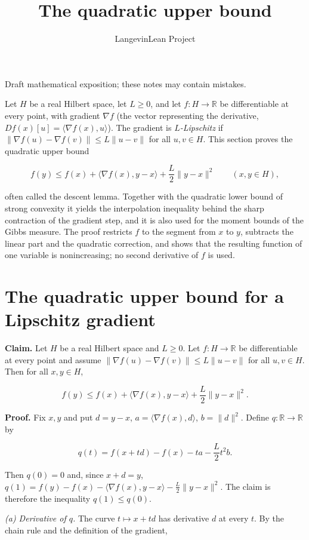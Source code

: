 \documentclass[11pt,a4paper]{article}
\title{\texorpdfstring{The quadratic upper bound}{The quadratic upper bound}}
\author{LangevinLean Project}
\date{}
\begin{document}
\maketitle
Draft mathematical exposition; these notes may contain mistakes.


Let \(H\) be a real Hilbert space, let \(L\ge0\), and let \(f:H\to\mathbb R\) be differentiable at every point, with gradient \(\nabla f\) (the vector representing the derivative, \(Df(x)[u]=\langle\nabla f(x),u\rangle\)). The gradient is \emph{\(L\)-Lipschitz} if \(\|\nabla f(u)-\nabla f(v)\|\le L\|u-v\|\) for all \(u,v\in H\). This section proves the quadratic upper bound


\[f(y)\le f(x)+\langle\nabla f(x),y-x\rangle+\frac L2\|y-x\|^2\qquad(x,y\in H),\]


often called the descent lemma. Together with the quadratic lower bound of strong convexity it yields the interpolation inequality behind the sharp contraction of the gradient step, and it is also used for the moment bounds of the Gibbs measure. The proof restricts \(f\) to the segment from \(x\) to \(y\), subtracts the linear part and the quadratic correction, and shows that the resulting function of one variable is nonincreasing; no second derivative of \(f\) is used.


\section{\texorpdfstring{The quadratic upper bound for a Lipschitz gradient}{The quadratic upper bound for a Lipschitz gradient}}


\textbf{Claim.} Let \(H\) be a real Hilbert space and \(L\ge0\). Let \(f:H\to\mathbb R\) be differentiable at every point and assume \(\|\nabla f(u)-\nabla f(v)\|\le L\|u-v\|\) for all \(u,v\in H\). Then for all \(x,y\in H\),


\[f(y)\le f(x)+\langle\nabla f(x),y-x\rangle+\frac L2\|y-x\|^2.\]


\textbf{Proof.} Fix \(x,y\) and put \(d=y-x\), \(a=\langle\nabla f(x),d\rangle\), \(b=\|d\|^2\). Define \(q:\mathbb R\to\mathbb R\) by


\[q(t)=f(x+td)-f(x)-ta-\frac L2t^2b.\]


Then \(q(0)=0\) and, since \(x+d=y\), \(q(1)=f(y)-f(x)-\langle\nabla f(x),y-x\rangle-\frac L2\|y-x\|^2\). The claim is therefore the inequality \(q(1)\le q(0)\).




\emph{(a) Derivative of \(q\).} The curve \(t\mapsto x+td\) has derivative \(d\) at every \(t\). By the chain rule and the definition of the gradient,
\end{document}
